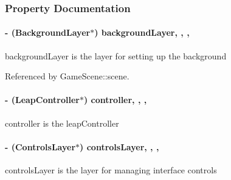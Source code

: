 \subsubsection{Property Documentation}
\hypertarget{interface_game_manager_a2a3a96f1202b13592f244cf1402b4051}{
\paragraph[{background\-Layer}]{\setlength{\rightskip}{0pt plus 5cm}-\/ ({\bf Background\-Layer}$\ast$) background\-Layer\hspace{0.3cm}{\ttfamily [read]}, {\ttfamily [write]}, {\ttfamily [nonatomic]}, {\ttfamily [strong]}}}\label{d4/d94/interface_game_manager_a2a3a96f1202b13592f244cf1402b4051}
background\-Layer is the layer for setting up the background 

Referenced by Game\-Scene\-::scene.

\hypertarget{interface_game_manager_a4b089253ae3569099d28535b128f3436}{
\paragraph[{controller}]{\setlength{\rightskip}{0pt plus 5cm}-\/ (Leap\-Controller$\ast$) controller\hspace{0.3cm}{\ttfamily [read]}, {\ttfamily [write]}, {\ttfamily [nonatomic]}, {\ttfamily [strong]}}}\label{d4/d94/interface_game_manager_a4b089253ae3569099d28535b128f3436}
controller is the leap\-Controller \hypertarget{interface_game_manager_a0ee5903be06e4a676ddde4c1f03530a7}{
\paragraph[{controls\-Layer}]{\setlength{\rightskip}{0pt plus 5cm}-\/ ({\bf Controls\-Layer}$\ast$) controls\-Layer\hspace{0.3cm}{\ttfamily [read]}, {\ttfamily [write]}, {\ttfamily [nonatomic]}, {\ttfamily [strong]}}}\label{d4/d94/interface_game_manager_a0ee5903be06e4a676ddde4c1f03530a7}
controls\-Layer is the layer for managing interface controls 

